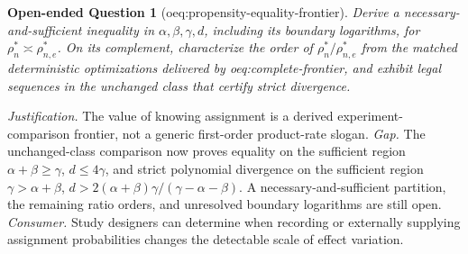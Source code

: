 \documentclass{article}
\newtheorem{openendedquestion}{Open-ended Question}
\begin{document}
\begin{openendedquestion}[oeq:propensity-equality-frontier]\label{oeq:propensity-equality-frontier}
Derive a necessary-and-sufficient inequality in \(\alpha,\beta,\gamma,d\), including its boundary logarithms, for \(\rho_n^*\asymp\rho_{n,e}^*\). On its complement, characterize the order of \(\rho_n^*/\rho_{n,e}^*\) from the matched deterministic optimizations delivered by oeq:complete-frontier, and exhibit legal sequences in the unchanged class that certify strict divergence.
\end{openendedquestion}
\par\smallskip\noindent \textit{Justification.} The value of knowing assignment is a derived experiment-comparison frontier, not a generic first-order product-rate slogan. \textit{Gap.} The unchanged-class comparison now proves equality on the sufficient region \(\alpha+\beta\ge\gamma\), \(d\le4\gamma\), and strict polynomial divergence on the sufficient region \(\gamma>\alpha+\beta\), \(d>2(\alpha+\beta)\gamma/(\gamma-\alpha-\beta)\).  A necessary-and-sufficient partition, the remaining ratio orders, and unresolved boundary logarithms are still open. \textit{Consumer.} Study designers can determine when recording or externally supplying assignment probabilities changes the detectable scale of effect variation.
\end{document}
